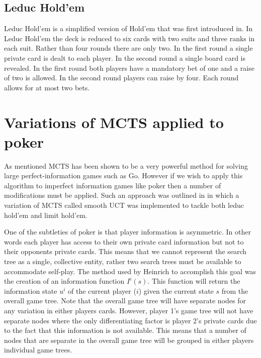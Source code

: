 \subsection{Leduc Hold'em}\label{subsec:leducHoldem}
Leduc Hold'em is a simplified version of Hold'em that was first introduced in\citep{southey2012bayes}.
In Leduc Hold'em the deck is reduced to six cards with two suits and three ranks in each suit.
Rather than four rounds there are only two.
In the first round a single private card is dealt to each player.
In the second round a single board card is revealed.
In the first round both players have a mandatory bet of one and a raise of two is allowed.
In the second round players can raise by four.
Each round allows for at most two bets.


\section{Variations of MCTS applied to poker}\label{mctsPoker}
As mentioned MCTS has been shown to be a very powerful method for solving large perfect-information
games such as Go.
However if we wish to apply this algorithm to imperfect information games like poker then 
a number of modifications must be applied.
Such an approach was outlined in \citep{heinrich2017reinforcement} in which a variation of 
MCTS called smooth UCT was implemented to tackle both leduc hold'em and limit hold'em.

One of the subtleties of poker is that player information is asymmetric.
In other words each player has access to their own private card 
information but not to their opponents private cards.
This means that we cannot represent the search tree as a single, collective 
entity\citep{heinrich2017reinforcement}, rather two search trees must be available 
to accommodate self-play.
The method used by Heinrich to accomplish this goal was the creation of 
an information function $I^i(s)$. 
This function will return the information state $u^i$ of the current player ($i$) given
the current state $s$ from the overall game tree.
Note that the overall game tree will have separate nodes for any variation 
in either players cards.
However, player 1's game tree will not have separate nodes where the only 
differentiating factor is player 2's private cards\cite{johanson2011accelerating} 
due to the fact that this information is not available.
This means that a number of nodes that are separate in the overall game tree will 
be grouped in either players individual game trees.

